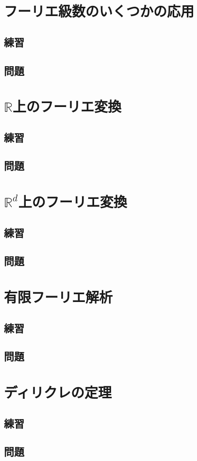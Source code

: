 \documentclass[platex]{jsarticle}
\begin{document}
\newpage
\section{フーリエ級数のいくつかの応用}
\setcounter{subsection}{4}
\subsection{練習}
\subsection{問題}

\newpage
\section{$\mathbb{R}$上のフーリエ変換}
\setcounter{subsection}{4}
\subsection{練習}
\subsection{問題}

\newpage
\section{$\mathbb{R}^d$上のフーリエ変換}
\setcounter{subsection}{5}
\subsection{練習}
\subsection{問題}

\newpage
\section{有限フーリエ解析}
\setcounter{subsection}{2}
\subsection{練習}
\subsection{問題}

\newpage
\section{ディリクレの定理}
\setcounter{subsection}{3}
\subsection{練習}
\subsection{問題}
\end{document}
